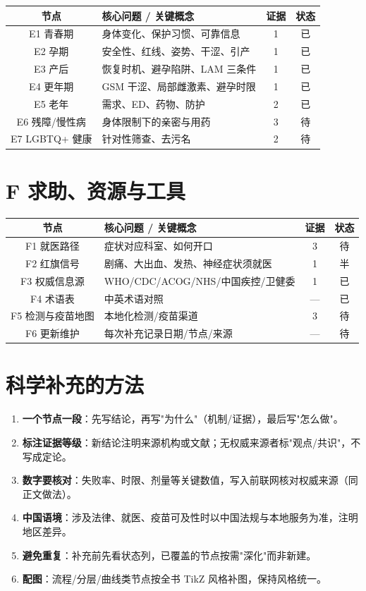 \documentclass[12pt,UTF8,openany]{ctexbook}
\begin{document}
\begin{tabularx}{\linewidth}{C X c c}
\toprule
\textbf{节点} & \textbf{核心问题 / 关键概念} & \textbf{证据} & \textbf{状态} \\
\midrule
E1 青春期 & 身体变化、保护习惯、可靠信息 & 1 & 已 \\
E2 孕期 & 安全性、红线、姿势、干涩、引产 & 1 & 已 \\
E3 产后 & 恢复时机、避孕陷阱、LAM 三条件 & 1 & 已 \\
E4 更年期 & GSM 干涩、局部雌激素、避孕时限 & 1 & 已 \\
E5 老年 & 需求、ED、药物、防护 & 2 & 已 \\
E6 残障/慢性病 & 身体限制下的亲密与用药 & 3 & 待 \\
E7 LGBTQ+ 健康 & 针对性筛查、去污名 & 2 & 待 \\
\bottomrule
\end{tabularx}

\section{F 求助、资源与工具}

\begin{tabularx}{\linewidth}{C X c c}
\toprule
\textbf{节点} & \textbf{核心问题 / 关键概念} & \textbf{证据} & \textbf{状态} \\
\midrule
F1 就医路径 & 症状对应科室、如何开口 & 3 & 待 \\
F2 红旗信号 & 剧痛、大出血、发热、神经症状须就医 & 1 & 半 \\
F3 权威信息源 & WHO/CDC/ACOG/NHS/中国疾控/卫健委 & 1 & 已 \\
F4 术语表 & 中英术语对照 & --- & 已 \\
F5 检测与疫苗地图 & 本地化检测/疫苗渠道 & 3 & 待 \\
F6 更新维护 & 每次补充记录日期/节点/来源 & --- & 待 \\
\bottomrule
\end{tabularx}

\section{科学补充的方法}

\begin{enumerate}[leftmargin=2em,itemsep=0.3em]
  \item \textbf{一个节点一段}：先写结论，再写"为什么"（机制/证据），最后写"怎么做"。
  \item \textbf{标注证据等级}：新结论注明来源机构或文献；无权威来源者标"观点/共识"，不写成定论。
  \item \textbf{数字要核对}：失败率、时限、剂量等关键数值，写入前联网核对权威来源（同正文做法）。
  \item \textbf{中国语境}：涉及法律、就医、疫苗可及性时以中国法规与本地服务为准，注明地区差异。
  \item \textbf{避免重复}：补充前先看状态列，已覆盖的节点按需"深化"而非新建。
  \item \textbf{配图}：流程/分层/曲线类节点按全书 TikZ 风格补图，保持风格统一。
\end{enumerate}
\end{document}
